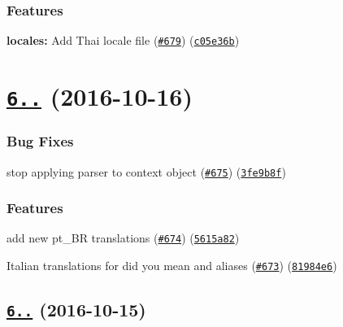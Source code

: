 \subsubsection*{Features}


\begin{DoxyItemize}
\item {\bfseries locales\+:} Add Thai locale file (\href{https://github.com/yargs/yargs/issues/679}{\tt \#679}) (\href{https://github.com/yargs/yargs/commit/c05e36b}{\tt c05e36b})
\end{DoxyItemize}

\label{_6.2.0}%
 \section*{\href{https://github.com/yargs/yargs/compare/v6.1.1...v6.2.0}{\tt 6..} (2016-\/10-\/16)}

\subsubsection*{Bug Fixes}


\begin{DoxyItemize}
\item stop applying parser to context object (\href{https://github.com/yargs/yargs/issues/675}{\tt \#675}) (\href{https://github.com/yargs/yargs/commit/3fe9b8f}{\tt 3fe9b8f})
\end{DoxyItemize}

\subsubsection*{Features}


\begin{DoxyItemize}
\item add new pt\+\_\+\+BR translations (\href{https://github.com/yargs/yargs/issues/674}{\tt \#674}) (\href{https://github.com/yargs/yargs/commit/5615a82}{\tt 5615a82})
\item Italian translations for \textquotesingle{}did you mean\textquotesingle{} and \textquotesingle{}aliases\textquotesingle{} (\href{https://github.com/yargs/yargs/issues/673}{\tt \#673}) (\href{https://github.com/yargs/yargs/commit/81984e6}{\tt 81984e6})
\end{DoxyItemize}

\label{_6.1.1}%
 \subsection*{\href{https://github.com/yargs/yargs/compare/v6.1.0...v6.1.1}{\tt 6..} (2016-\/10-\/15)}

